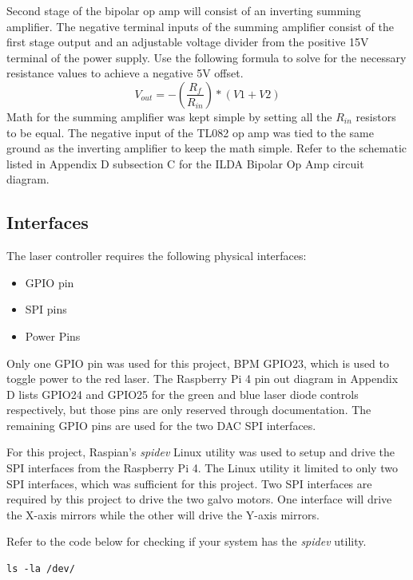 \documentclass[journal]{IEEEtran}
\begin{document}
    Second stage of the bipolar op amp will consist of an inverting summing amplifier.
    The negative terminal inputs of the summing amplifier consist of the first stage output and an adjustable voltage divider from the positive 15V terminal of the power supply.
    Use the following formula to solve for the necessary resistance values to achieve a negative 5V offset.
    $$ V_{out} = -(\frac{R_{f}}{R_{in}}) * (V1 + V2)$$ 
    Math for the summing amplifier was kept simple by setting all the $R_{in}$ resistors to be equal.
    The negative input of the TL082 op amp was tied to the same ground as the inverting amplifier to keep the math simple.
    Refer to the schematic listed in Appendix D subsection C for the ILDA Bipolar Op Amp circuit diagram.

    \subsection{Interfaces}
    The laser controller requires the following physical interfaces:
    \begin{itemize}
        \item GPIO pin
        \item SPI pins
        \item Power Pins
    \end{itemize}

    Only one GPIO pin was used for this project, BPM GPIO23, which is used to toggle power to the red laser.
    The Raspberry Pi 4 pin out diagram in Appendix D lists GPIO24 and GPIO25 for the green and blue laser diode controls respectively, but those pins are only reserved through documentation.
    The remaining GPIO pins are used for the two DAC SPI interfaces.

    For this project, Raspian's \emph{spidev} Linux utility was used to setup and drive the SPI interfaces from the Raspberry Pi 4. 
    The Linux utility it limited to only two SPI interfaces, which was sufficient for this project.
    Two SPI interfaces are required by this project to drive the two galvo motors.
    One interface will drive the X-axis mirrors while the other will drive the Y-axis mirrors.
    
    Refer to the code below for checking if your system has the \emph{spidev} utility.

    \begin{lstlisting}[frame=single, basicstyle=\ttfamily\footnotesize, breaklines=true]
        ls -la /dev/
    \end{lstlisting}
\end{document}
